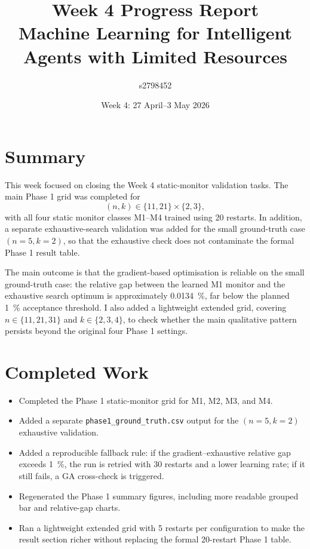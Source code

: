 \documentclass[11pt,a4paper]{article}
\title{Week 4 Progress Report\\
\large Machine Learning for Intelligent Agents with Limited Resources}
\author{s2798452}
\date{Week 4: 27 April--3 May 2026}
\begin{document}
\maketitle

\section{Summary}

This week focused on closing the Week 4 static-monitor validation tasks. The
main Phase 1 grid was completed for
\[
  (n,k) \in \{11,21\} \times \{2,3\},
\]
with all four static monitor classes M1--M4 trained using 20 restarts. In
addition, a separate exhaustive-search validation was added for the small
ground-truth case $(n=5,k=2)$, so that the exhaustive check does not contaminate
the formal Phase 1 result table.

The main outcome is that the gradient-based optimisation is reliable on the
small ground-truth case: the relative gap between the learned M1 monitor and
the exhaustive search optimum is approximately \SI{0.0134}{\percent}, far below
the planned \SI{1}{\percent} acceptance threshold. I also added a lightweight
extended grid, covering $n \in \{11,21,31\}$ and $k \in \{2,3,4\}$, to check
whether the main qualitative pattern persists beyond the original four
Phase 1 settings.

\section{Completed Work}

\begin{itemize}
  \item Completed the Phase 1 static-monitor grid for M1, M2, M3, and M4.
  \item Added a separate \texttt{phase1\_ground\_truth.csv} output for the
  $(n=5,k=2)$ exhaustive validation.
  \item Added a reproducible fallback rule: if the gradient--exhaustive relative
  gap exceeds \SI{1}{\percent}, the run is retried with 30 restarts and a lower
  learning rate; if it still fails, a GA cross-check is triggered.
  \item Regenerated the Phase 1 summary figures, including more readable
  grouped bar and relative-gap charts.
  \item Ran a lightweight extended grid with 5 restarts per configuration to
  make the result section richer without replacing the formal 20-restart Phase
  1 table.
\end{itemize}
\end{document}
